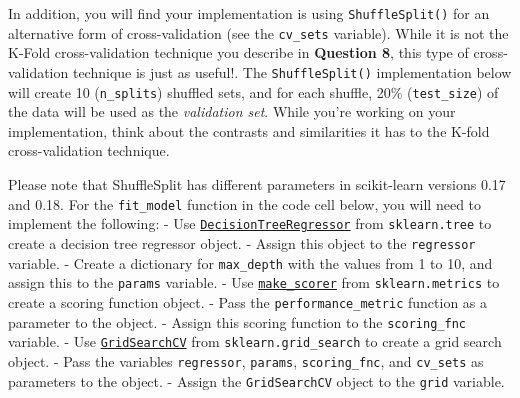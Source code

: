 \documentclass[11pt]{article}
\begin{document}
In addition, you will find your implementation is using
\texttt{ShuffleSplit()} for an alternative form of cross-validation (see
the \texttt{\textquotesingle{}cv\_sets\textquotesingle{}} variable).
While it is not the K-Fold cross-validation technique you describe in
\textbf{Question 8}, this type of cross-validation technique is just as
useful!. The \texttt{ShuffleSplit()} implementation below will create 10
(\texttt{\textquotesingle{}n\_splits\textquotesingle{}}) shuffled sets,
and for each shuffle, 20\%
(\texttt{\textquotesingle{}test\_size\textquotesingle{}}) of the data
will be used as the \emph{validation set}. While you're working on your
implementation, think about the contrasts and similarities it has to the
K-fold cross-validation technique.

Please note that ShuffleSplit has different parameters in scikit-learn
versions 0.17 and 0.18. For the \texttt{fit\_model} function in the code
cell below, you will need to implement the following: - Use
\href{http://scikit-learn.org/stable/modules/generated/sklearn.tree.DecisionTreeRegressor.html}{\texttt{DecisionTreeRegressor}}
from \texttt{sklearn.tree} to create a decision tree regressor object. -
Assign this object to the
\texttt{\textquotesingle{}regressor\textquotesingle{}} variable. -
Create a dictionary for
\texttt{\textquotesingle{}max\_depth\textquotesingle{}} with the values
from 1 to 10, and assign this to the
\texttt{\textquotesingle{}params\textquotesingle{}} variable. - Use
\href{http://scikit-learn.org/stable/modules/generated/sklearn.metrics.make_scorer.html}{\texttt{make\_scorer}}
from \texttt{sklearn.metrics} to create a scoring function object. -
Pass the \texttt{performance\_metric} function as a parameter to the
object. - Assign this scoring function to the
\texttt{\textquotesingle{}scoring\_fnc\textquotesingle{}} variable. -
Use
\href{http://scikit-learn.org/0.17/modules/generated/sklearn.grid_search.GridSearchCV.html}{\texttt{GridSearchCV}}
from \texttt{sklearn.grid\_search} to create a grid search object. -
Pass the variables
\texttt{\textquotesingle{}regressor\textquotesingle{}},
\texttt{\textquotesingle{}params\textquotesingle{}},
\texttt{\textquotesingle{}scoring\_fnc\textquotesingle{}}, and
\texttt{\textquotesingle{}cv\_sets\textquotesingle{}} as parameters to
the object. - Assign the \texttt{GridSearchCV} object to the
\texttt{\textquotesingle{}grid\textquotesingle{}} variable.
\end{document}
